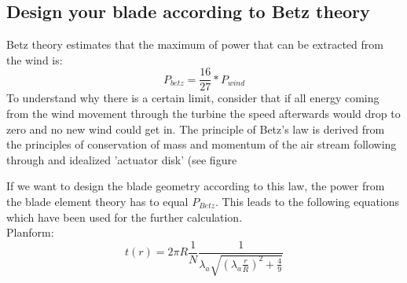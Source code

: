 \documentclass[10pt]{article}
\begin{document}
\subsection{Design your blade according to Betz theory}
Betz theory estimates that the maximum of power that can be extracted from the wind is:
\begin{equation}
P_{betz} = \frac{16}{27}*P_{wind}
\end{equation}
To understand why there is a certain limit, consider that if all energy coming from the wind movement through the turbine the speed afterwards would drop to zero and no new wind could get in.
The principle of Betz's law is derived from the principles of conservation of mass and momentum of the air stream following through and idealized 'actuator disk' (see figure~%

If we want to design the blade geometry according to this law, the power from the blade element theory has to equal $P_{Betz}$. This leads to the following equations which have been used for the further calculation.\\

Planform:
\begin{equation}
t(r) = 2\pi R \frac{1}{N}\frac{1}{\lambda_a\sqrt{(\lambda_a\frac{r}{R})^2+\frac{4}{9}}}
\end{equation}
\end{document}
